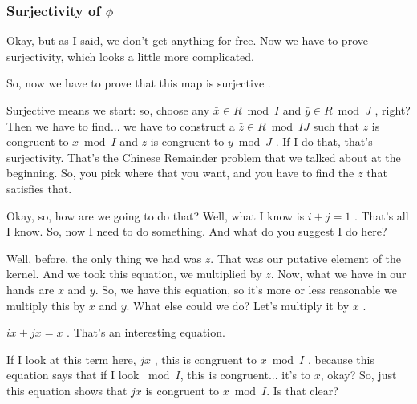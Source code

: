 \begin{proofWrapper}
\subsubsection{Surjectivity of \texorpdfstring{$\phi$}{phi}}

\begin{speech}[00:09:25 - 00:11:15]
Okay, but as I said, we don't get anything for free. Now we have to prove surjectivity, which looks a little more complicated.

So, now we have to prove that this map is surjective .

Surjective means we start: so, choose any $\bar{x} \in R \bmod I$ and $\bar{y} \in R \bmod J$ , right? Then we have to find... we have to construct a $\bar{z} \in R \bmod IJ$ such that  $z$ is congruent to $x \bmod I$ and $z$ is congruent to $y \bmod J$ . If I do that, that's surjectivity. That's the Chinese Remainder problem that we talked about at the beginning. So, you pick where that you want, and you have to find the $z$ that satisfies that.

Okay, so, how are we going to do that? Well, what I know is $i + j = 1$ . That's all I know. So, now I need to do something. And what do you suggest I do here?

Well, before, the only thing we had was $z$. That was our putative element of the kernel. And we took this equation, we multiplied by $z$. Now, what we have in our hands are $x$ and $y$. So, we have this equation, so it's more or less reasonable we multiply this by $x$ and $y$. What else could we do? Let's multiply it by $x$ .
\end{speech}

\begin{speech}[00:11:15 - 00:12:57]
$ix + jx = x$ . That's an interesting equation.

If I look at this term here, $jx$ , this is congruent to $x \bmod I$ , because this equation says that if I look $\bmod I$, this is congruent... it's to $x$, okay? So, just this equation shows that $jx$ is congruent to $x \bmod I$. Is that clear?


\end{speech}
\end{proofWrapper}
